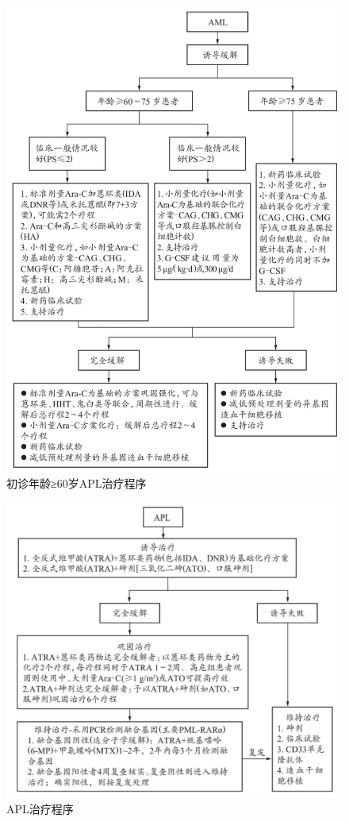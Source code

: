 \begin{figure}[!htbp]
 \centering
 \includegraphics{./images/Image00142.jpg}
 \captionsetup{justification=centering}
 \caption{初诊年龄≥60岁APL治疗程序}
 \label{fig5-1-9}
  \end{figure} 

\begin{figure}[!htbp]
 \centering
 \includegraphics{./images/Image00143.jpg}
 \captionsetup{justification=centering}
 \caption{APL治疗程序}
 \label{fig5-1-10}
  \end{figure} 

